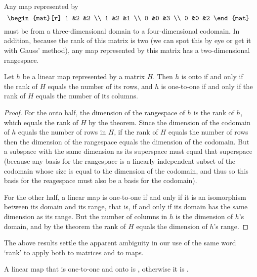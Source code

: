\begin{example}
Any map represented by
\begin{equation*}
    \begin{mat}[r]
      1  &2  &2  \\
      1  &2  &1  \\
      0  &0  &3  \\
      0  &0  &2
    \end{mat}
\end{equation*}
must be from a three-dimensional domain
to a four-dimensional codomain.
In addition, because the rank of this matrix is two 
(we can spot this by eye or get it with Gauss' method),
any map represented by this matrix has a two-dimensional rangespace.
\end{example}

\begin{corollary} \label{cor:MatDescsMap}
Let $h$ be a linear map represented by a matrix $H$.
Then $h$ is onto if and only if the rank of $H$ equals the number 
of its rows, 
and $h$ is one-to-one if and only if the rank of $H$ equals the number of
its columns.
\end{corollary}

\begin{proof}
For the onto half, the dimension of the rangespace of $h$ is the rank of $h$,
which equals the rank of $H$ by the theorem.
Since the dimension of the codomain of $h$ equals the number of rows in $H$,
if the rank of $H$ equals the number of rows then the dimension of the
rangespace equals the dimension of the codomain.
But a subspace with the same dimension as its superspace must equal
that superspace
(because any basis for the rangespace is a linearly independent subset 
of the codomain
whose size is equal to the dimension of the codomain, and thus so this 
basis for the reagespace must also be 
a basis for the codomain).

For the other half, 
a linear map is one-to-one if and only if it is an isomorphism
between its domain and its range, that is, if and only if its domain has the
same dimension as its range.
But the number of columns in $h$ is the dimension of $h$'s domain, and
by the theorem the rank of $H$ equals the dimension of 
$h$'s range.
\end{proof}

The above results settle the apparent ambiguity in our use of the same
word `rank' to apply both to matrices and to maps.

\begin{definition}
A linear map that is one-to-one and onto is 
%
, otherwise it is 
%
.
\end{definition}

